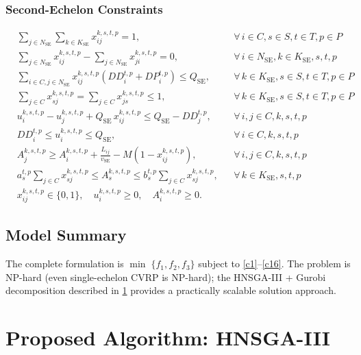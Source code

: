 \documentclass[11pt, a4paper]{article}
\newcommand{\KSE}{K_{\mathrm{SE}}}
\newcommand{\NSE}{N_{\mathrm{SE}}}
\newcommand{\QSE}{Q_{\mathrm{SE}}}
\newcommand{\vSE}{v_{\mathrm{SE}}}
\numberwithin{equation}{section}
\begin{document}
\subsubsection{Second-Echelon Constraints}

\begin{align}
  &\sum_{j\in\NSE}\sum_{k\in\KSE}x_{ij}^{k,s,t,p}=1,
  &&\forall\,i\in C,s\in S,t\in T,p\in P
  \tag{C9}\label{c9}\\
  &\sum_{j\in\NSE}x_{ij}^{k,s,t,p}-\sum_{j\in\NSE}x_{ji}^{k,s,t,p}=0,
  &&\forall\,i\in\NSE,k\in\KSE,s,t,p
  \tag{C10}\label{c10}\\
  &\sum_{i\in C,j\in\NSE}x_{ij}^{k,s,t,p}(DD_i^{t,p}+DP_i^{t,p})\le\QSE,
  &&\forall\,k\in\KSE,s\in S,t\in T,p\in P
  \tag{C11}\label{c11}\\
  &\sum_{j\in C}x_{sj}^{k,s,t,p}=\sum_{j\in C}x_{js}^{k,s,t,p}\le 1,
  &&\forall\,k\in\KSE,s\in S,t\in T,p\in P
  \tag{C12}\label{c12}\\
  &u_i^{k,s,t,p}-u_j^{k,s,t,p}+\QSE\,x_{ij}^{k,s,t,p}\le\QSE-DD_j^{t,p},
  &&\forall\,i,j\in C,k,s,t,p
  \tag{C13a}\label{c13a}\\
  &DD_i^{t,p}\le u_i^{k,s,t,p}\le\QSE,
  &&\forall\,i\in C,k,s,t,p
  \tag{C13b}\label{c13b}\\
  &A_j^{k,s,t,p}\ge A_i^{k,s,t,p}+\frac{L_{ij}}{\vSE}
    -M(1-x_{ij}^{k,s,t,p}),
  &&\forall\,i,j\in C,k,s,t,p
  \tag{C14}\label{c14}\\
  &a_s^{t,p}\sum_{j\in C}x_{sj}^{k,s,t,p}\le A_s^{k,s,t,p}
    \le b_s^{t,p}\sum_{j\in C}x_{sj}^{k,s,t,p},
  &&\forall\,k\in\KSE,s,t,p
  \tag{C15}\label{c15}\\
  &x_{ij}^{k,s,t,p}\in\{0,1\},\quad
  u_i^{k,s,t,p}\ge 0,\quad
  A_i^{k,s,t,p}\ge 0.
  \tag{C16}\label{c16}
\end{align}

\subsection{Model Summary}

The complete formulation is $\min\;\{f_1,f_2,f_3\}$ subject to
\eqref{c1}--\eqref{c16}.  The problem is NP-hard (even single-echelon CVRP
is NP-hard); the HNSGA-III + Gurobi decomposition described in \cref{sec:alg}
provides a practically scalable solution approach.

\section{Proposed Algorithm: HNSGA-III}
\label{sec:alg}
\end{document}
